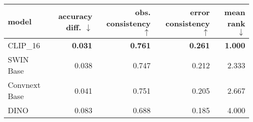 \begin{tabular}{lrrrr}
\toprule
        model & accuracy diff. $\downarrow$ & obs. consistency $\uparrow$ & error consistency $\uparrow$ & mean rank $\downarrow$ \\
\midrule
     CLIP\_16 &              \textbf{0.031} &              \textbf{0.761} &               \textbf{0.261} &         \textbf{1.000} \\
    SWIN Base &                       0.038 &                       0.747 &                        0.212 &                  2.333 \\
Convnext Base &                       0.041 &                       0.751 &                        0.205 &                  2.667 \\
         DINO &                       0.083 &                       0.688 &                        0.185 &                  4.000 \\
\bottomrule
\end{tabular}

